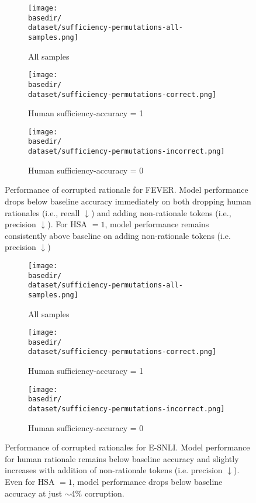 \def \dataset {fever}
\def \basedir {new_plots}
\begin{figure*}[h]
\centering
\begin{subfigure}[t]{0.41\textwidth}
    \centering
    \texttt{[image: \\basedir/\\dataset/sufficiency-permutations-all-samples.png]}
    \caption{All samples}
    \label{fig:fever_perturbation_plots_all}
\end{subfigure}
\begin{subfigure}[t]{0.28\textwidth}
    \centering
    \texttt{[image: \\basedir/\\dataset/sufficiency-permutations-correct.png]}
    \caption{Human sufficiency-accuracy = 1}
    \label{fig:fever_perturbation_plots_suffacc_1}
\end{subfigure}
\begin{subfigure}[t]{0.28\textwidth}
    \centering
    \texttt{[image: \\basedir/\\dataset/sufficiency-permutations-incorrect.png]}
    \caption{Human sufficiency-accuracy = 0}
    \label{fig:fever_perturbation_plots_suffacc_0}
\end{subfigure}
\caption{Performance of corrupted rationale for FEVER. Model performance drops below baseline accuracy immediately on both dropping human rationales (i.e., recall $\downarrow$) and adding non-rationale tokens (i.e., precision $\downarrow$). For HSA $=1$, model performance remains consistently above baseline on adding non-rationale tokens (i.e. precision $\downarrow$)}
\label{fig:fever_perturbation_plots}
\end{figure*}


\def \dataset {ensli}
\def \basedir {new_plots}
\begin{figure*}[h]
\centering
\begin{subfigure}[t]{0.41\textwidth}
    \centering
    \texttt{[image: \\basedir/\\dataset/sufficiency-permutations-all-samples.png]}
    \caption{All samples}
    \label{fig:ensli_perturbation_plots_all}
\end{subfigure}
\begin{subfigure}[t]{0.28\textwidth}
    \centering
    \texttt{[image: \\basedir/\\dataset/sufficiency-permutations-correct.png]}
    \caption{Human sufficiency-accuracy = 1}
    \label{fig:ensli_perturbation_plots_suffacc_1}
\end{subfigure}
\begin{subfigure}[t]{0.28\textwidth}
    \centering
    \texttt{[image: \\basedir/\\dataset/sufficiency-permutations-incorrect.png]}
    \caption{Human sufficiency-accuracy = 0}
    \label{fig:ensli_perturbation_plots_suffacc_0}
\end{subfigure}
\caption{Performance of corrupted rationales for E-SNLI. Model performance for human rationale remains below baseline accuracy and slightly increases with addition of non-rationale tokens (i.e. precision $\downarrow$).  Even for HSA $=1$, model performance drops below baseline accuracy at just $\sim$4\% corruption.}
\label{fig:ensli_perturbation_plots}
\end{figure*}

